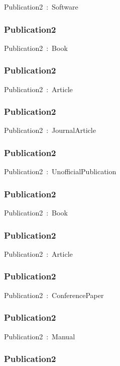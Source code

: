 \documentclass{article}
\begin{document}
Publication2~:~Software

\subsubsection*{Publication2}

Publication2~:~Book

\subsubsection*{Publication2}

Publication2~:~Article

\subsubsection*{Publication2}

Publication2~:~JournalArticle

\subsubsection*{Publication2}

Publication2~:~UnofficialPublication

\subsubsection*{Publication2}

Publication2~:~Book

\subsubsection*{Publication2}

Publication2~:~Article

\subsubsection*{Publication2}

Publication2~:~ConferencePaper

\subsubsection*{Publication2}

Publication2~:~Manual

\subsubsection*{Publication2}
\end{document}
